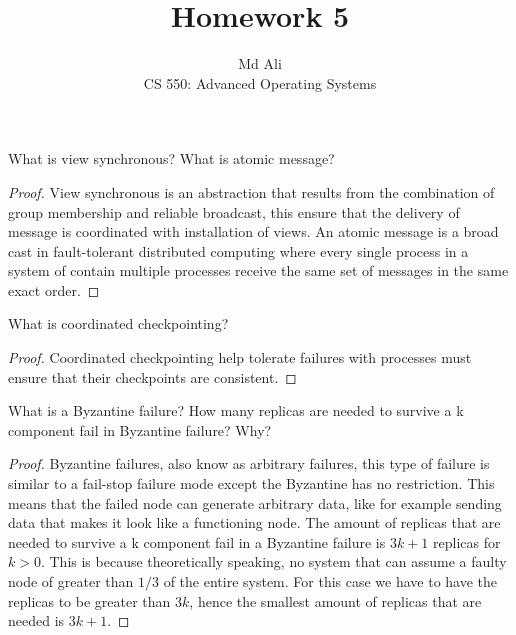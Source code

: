 \documentclass[12pt]{article}
\newenvironment{exercise}[2][Exercise]{\begin{trivlist}
\item[\hskip \labelsep {\bfseries #1}\hskip \labelsep {\bfseries #2.}]}{\end{trivlist}}
\begin{document}
 
\title{Homework 5}
\author{Md Ali\\ 
CS 550: Advanced Operating Systems}
\maketitle

\begin{exercise}{1}
What is view synchronous? What is atomic message?
\end{exercise} 

\begin{proof}
View synchronous is an abstraction that results from the combination of group membership and reliable broadcast, this ensure that the delivery of message is coordinated with installation of views. An atomic message is a broad cast in fault-tolerant distributed computing where every single process in a system of contain multiple processes receive the same set of messages in the same exact order. 
\end{proof}
 
\begin{exercise}{2}
What is coordinated checkpointing? 
\end{exercise}
 
\begin{proof}
Coordinated checkpointing help tolerate failures with processes must ensure that their checkpoints are consistent. 
\end{proof}

\begin{exercise}{3}
What is a Byzantine failure? How many replicas are needed to survive a k component fail in Byzantine failure? Why?
\end{exercise}

\begin{proof}
Byzantine failures, also know as arbitrary failures, this type of failure is similar to a fail-stop failure mode except the Byzantine has no restriction. This means that the failed node can generate arbitrary data, like for example sending data that makes it look like a functioning node. The amount of replicas that are needed to survive a k component fail in a Byzantine failure is $3k + 1$ replicas for $k> 0$. This is because theoretically speaking, no system that can assume a faulty node of greater than $1/3$ of the entire system. For this case we have to have the replicas to be greater than $3k$, hence the smallest amount of replicas that are needed is $3k + 1$.
\end{proof}
 
\end{document}
